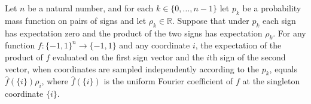 \begin{theorem}
\label{FABL.pmfExpectation_apply_left_mul_right_eq_fourierCoeff_mul_correlation}
\leanok
{}
Let $n$ be a natural number, and for each $k\in\{0,\ldots,n-1\}$ let $p_k$ be a
probability mass function on pairs of signs and let $\rho_k\in\mathbb R$. Suppose that
under $p_k$ each sign has expectation zero and the product of the two signs has
expectation $\rho_k$. For any function $f:\{-1,1\}^n\to\{-1,1\}$ and any coordinate $i$,
the expectation of the product of $f$ evaluated on the first sign vector and the $i$th
sign of the second vector, when coordinates are sampled independently according to the
$p_k$, equals $\widehat f(\{i\})\rho_i$, where $\widehat f(\{i\})$ is the uniform
Fourier coefficient of $f$ at the singleton coordinate $\{i\}$.
\end{theorem}

